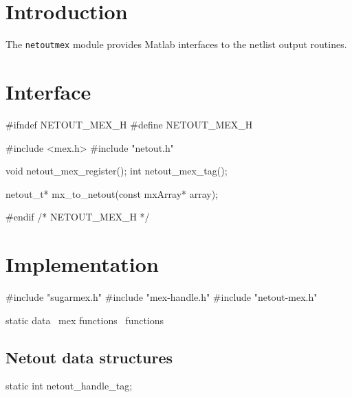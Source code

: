 
\section{Introduction}

The {\tt{}netout{}mex} module provides Matlab interfaces to
the netlist output routines.


\section{Interface}

\endmoddef
#ifndef NETOUT_MEX_H
#define NETOUT_MEX_H

#include <mex.h>
#include "netout.h"

void netout_mex_register();
int  netout_mex_tag();

netout_t* mx_to_netout(const mxArray* array);

#endif /* NETOUT_MEX_H */
\nwendcode{}\nwdocspar


\section{Implementation}

\nwenddocs{}\endmoddef
#include "sugarmex.h"
#include "mex-handle.h"
#include "netout-mex.h"

\LA{}static data~{\nwtagstyle{}}\RA{}
\LA{}mex functions~{\nwtagstyle{}}\RA{}
\LA{}functions~{\nwtagstyle{}}\RA{}
\nwendcode{}\nwdocspar


\subsection{Netout data structures}

\nwenddocs{}\endmoddef
static int netout_handle_tag;

\nwendcode{}\nwdocspar

